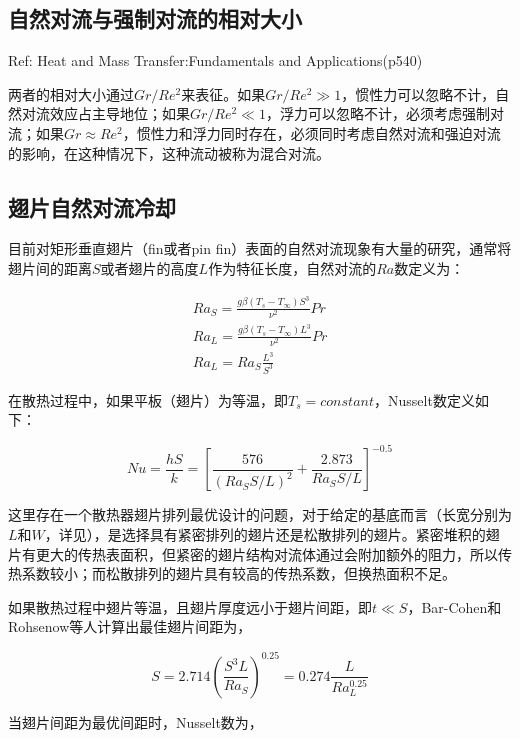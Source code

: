 \subsection{自然对流与强制对流的相对大小}

Ref: Heat and Mass Transfer:Fundamentals and Applications(p540)

两者的相对大小通过$ Gr/Re^2 $来表征。如果$ Gr/Re^2 \gg 1 $，惯性力可以忽略不计，自然对流效应占主导地位；如果$ Gr/Re^2 \ll 1 $，浮力可以忽略不计，必须考虑强制对流；如果$ Gr\approx Re^2 $，惯性力和浮力同时存在，必须同时考虑自然对流和强迫对流的影响，在这种情况下，这种流动被称为混合对流。

\subsection{翅片自然对流冷却}

目前对矩形垂直翅片（fin或者pin fin）表面的自然对流现象有大量的研究，通常将翅片间的距离$ S $或者翅片的高度$ L $作为特征长度，自然对流的$ Ra $数定义为：

\begin{gather}
Ra_S = \frac{g\beta(T_s - T_{\infty})S^3}{\nu^2}Pr \\
Ra_L = \frac{g\beta(T_s - T_{\infty})L^3}{\nu^2}Pr \\
Ra_L = Ra_S \frac{L^3}{S^3}
\end{gather}

在散热过程中，如果平板（翅片）为等温，即$ T_s = constant $，Nusselt数定义如下：

\begin{equation}
Nu = \frac{hS}{k} = \left[ \frac{576}{(Ra_S S/L)^2} + \frac{2.873}{Ra_S S/L} \right]^{-0.5}
\end{equation}

这里存在一个散热器翅片排列最优设计的问题，对于给定的基底而言（长宽分别为$ L $和$ W $，详见），是选择具有紧密排列的翅片还是松散排列的翅片。紧密堆积的翅片有更大的传热表面积，但紧密的翅片结构对流体通过会附加额外的阻力，所以传热系数较小；而松散排列的翅片具有较高的传热系数，但换热面积不足。

如果散热过程中翅片等温，且翅片厚度远小于翅片间距，即$ t \ll S $，Bar-Cohen和Rohsenow等人计算出最佳翅片间距为，

\begin{equation}
S = 2.714 \left( \frac{S^3 L}{Ra_S} \right)^{0.25} = 0.274 \frac{L}{Ra_L^{0.25}}
\end{equation}

当翅片间距为最优间距时，Nusselt数为，


